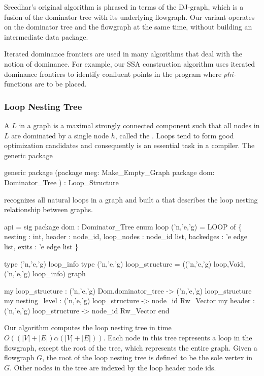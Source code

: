 Sreedhar's original algorithm is phrased in terms of the
DJ-graph, which is a fusion of the dominator tree
with its underlying flowgraph.  Our variant operates on the
dominator tree and the flowgraph at the same time, without
building an intermediate data package.  

Iterated dominance frontiers are used
in many algorithms that deal with the notion of dominance.
For example, our SSA construction algorithm uses iterated
dominance frontiers to identify confluent points in the program
where $phi$-functions are to be placed.

\subsubsection{Loop Nesting Tree}

A  $L$ in a graph is a maximal 
strongly connected component 
such that all nodes in $L$ are dominated by a single node $h$, called
the .  Loops tend to form good optimization candidates
and consequently  is an essential task in a compiler.
The generic package 
\begin{SML}
 generic package  
  (package meg: Make_Empty_Graph
   package dom: Dominator_Tree
  ) : Loop_Structure 
\end{SML}
recognizes all natural loops in a graph and built a 
that describes the loop nesting relationship between graphs.

\begin{SML}
 api  = sig
   package dom : Dominator_Tree
   enum loop ('n,'e,'g) =
      LOOP of \{ nesting    : int,
                header     : node_id,
                loop_nodes : node_id list,
                backedges  : 'e edge list,
                exits      : 'e edge list
              \}

   type ('n,'e,'g) loop_info
   type ('n,'e,'g) loop_structure = (('n,'e,'g) loop,Void, ('n,'e,'g) loop_info) graph

   my loop_structure : ('n,'e,'g) Dom.dominator_tree -> ('n,'e,'g) loop_structure
   my nesting_level : ('n,'e,'g) loop_structure -> node_id Rw_Vector
   my header        : ('n,'e,'g) loop_structure -> node_id Rw_Vector
 end
\end{SML}

Our algorithm computes the loop nesting tree in time 
$O((|V|+|E|)\alpha(|V|+|E|))$.
Each node in this tree represents a loop in the flowgraph, except the
root of the tree, which represents the entire graph.    
Given a flowgraph $G$, the root
of the loop nesting tree is defined to be the sole vertex in 
 $G$.  Other nodes in the tree
are indexed by the loop header node ids.

